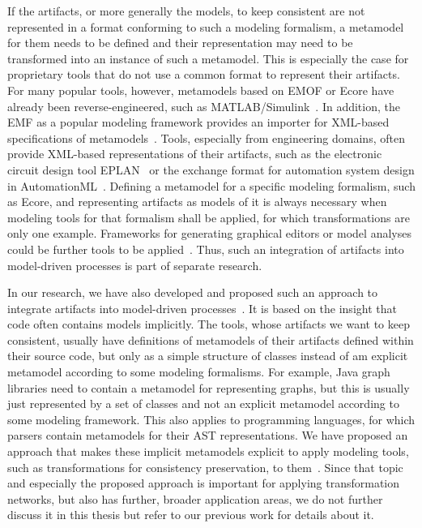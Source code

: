 If the artifacts, or more generally the models, to keep consistent are not represented in a format conforming to such a modeling formalism, a metamodel for them needs to be defined and their representation may need to be transformed into an instance of such a metamodel.
This is especially the case for proprietary tools that do not use a common format to represent their artifacts.
For many popular tools, however, metamodels based on \gls{EMOF} or Ecore have already been reverse-engineered, such as 
MATLAB/Simulink~\cite{heinzemann2013Reconfiguration-CBSE,son2012Simulink-CAGGIE,armengaud2011Safety-WCE}.
In addition, the \gls{EMF} as a popular modeling framework provides an importer for \gls{XML}-based specifications of metamodels~\cite[pp.~86]{steinberg2009emf}.
Tools, especially from engineering domains, often provide \gls{XML}-based representations of their artifacts, such as the electronic circuit design tool EPLAN~\cite{eplan} or the exchange format for automation system design in AutomationML~\cite{automationML}.
Defining a metamodel for a specific modeling formalism, such as Ecore, and representing artifacts as models of it is always necessary when modeling tools for that formalism shall be applied, for which transformations are only one example.
Frameworks for generating graphical editors or model analyses could be further tools to be applied~.
Thus, such an integration of artifacts into model-driven processes is part of separate research.

In our research, we have also developed and proposed such an approach to integrate artifacts into model-driven processes~.
It is based on the insight that code often contains models implicitly.
The tools, whose artifacts we want to keep consistent, usually have definitions of metamodels of their artifacts defined within their source code, but only as a simple structure of classes instead of am explicit metamodel according to some modeling formalisms.
For example, Java graph libraries need to contain a metamodel for representing graphs, but this is usually just represented by a set of classes and not an explicit metamodel according to some modeling framework.
This also applies to programming languages, for which parsers contain metamodels for their \gls{AST} representations.
We have proposed an approach that makes these implicit metamodels explicit to apply modeling tools, such as transformations for consistency preservation, to them~.
Since that topic and especially the proposed approach is important for applying transformation networks, but also has further, broader application areas, we do not further discuss it in this thesis but refer to our previous work for details about it.



